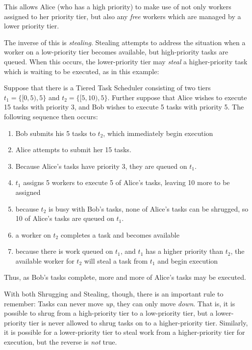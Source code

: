 This allows Alice (who has a high priority) to make use of not only workers assigned to her priority tier, but also any \emph{free} workers which are managed by a lower priority tier.

The inverse of this is \emph{stealing}. Stealing attempts to address the situation when a worker on a low-priority tier becomes available, but high-priority tasks are queued. When this occurs, the lower-priority tier may \emph{steal} a higher-priority task which is waiting to be executed, as in this example:

\begin{exmp}
Suppose that there is a Tiered Task Scheduler consisting of two tiers $t_1 = \{[0,5),5\}$ and $t_2 = \{[5,10),5\}$. Further suppose that Alice wishes to execute 15 tasks with priority 3, and Bob wishes to execute 5 tasks with priority 5. The following sequence then occurs:

\begin{enumerate}
\item Bob submits his 5 tasks to $t_2$, which immediately begin execution
\item Alice attempts to submit her 15 tasks.
\item Because Alice's tasks have priority 3, they are queued on $t_1$.
\item $t_1$ assigns 5 workers to execute 5 of Alice's tasks, leaving 10 more to be assigned
\item because $t_2$ is busy with Bob's tasks, none of Alice's tasks can be shrugged, so 10 of Alice's tasks are queued on $t_1$.
\item a worker on $t_2$ completes a task and becomes available
\item because there is work queued on $t_1$, and $t_1$ has a higher priority than $t_2$, the available worker for $t_2$ will steal a task from $t_1$ and begin execution
\end{enumerate}
Thus, as Bob's tasks complete, more and more of Alice's tasks may be executed.
\end{exmp}

With both Shrugging and Stealing, though, there is an important rule to remember: Tasks can never move \emph{up}, they can only move \emph{down}. That is, it is possible to shrug from a high-priority tier to a low-priority tier, but a lower-priority tier is never allowed to shrug tasks on to a higher-priority tier. Similarly, it is possible for a lower-priority tier to steal work from a higher-priority tier for execution, but the reverse is \emph{not} true. 

